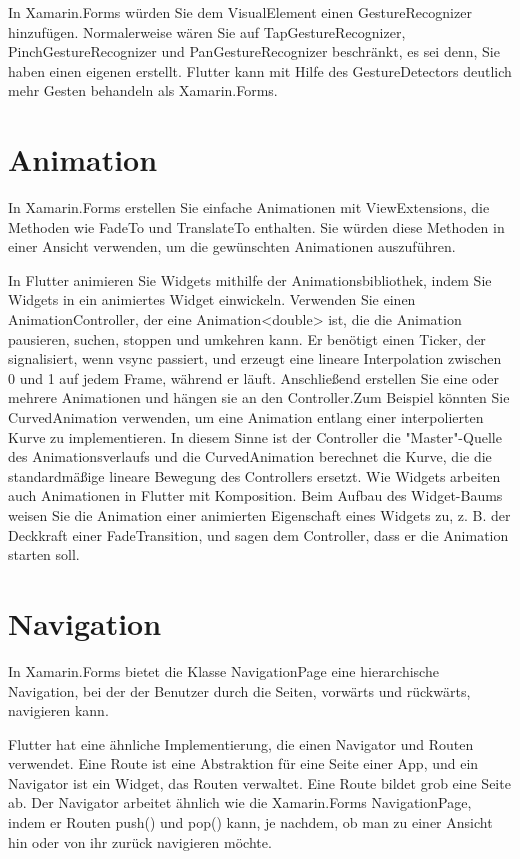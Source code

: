 In Xamarin.Forms würden Sie dem VisualElement einen GestureRecognizer hinzufügen. Normalerweise wären Sie auf TapGestureRecognizer, PinchGestureRecognizer und PanGestureRecognizer beschränkt, es sei denn, Sie haben einen eigenen erstellt. Flutter kann mit Hilfe des GestureDetectors deutlich mehr Gesten behandeln als Xamarin.Forms.

\section{Animation}
In Xamarin.Forms erstellen Sie einfache Animationen mit ViewExtensions, die Methoden wie FadeTo und TranslateTo enthalten. Sie würden diese Methoden in einer Ansicht verwenden, um die gewünschten Animationen auszuführen.

In Flutter animieren Sie Widgets mithilfe der Animationsbibliothek, indem Sie Widgets in ein animiertes Widget einwickeln. Verwenden Sie einen AnimationController, der eine Animation<double> ist, die die Animation pausieren, suchen, stoppen und umkehren kann. Er benötigt einen Ticker, der signalisiert, wenn vsync passiert, und erzeugt eine lineare Interpolation zwischen 0 und 1 auf jedem Frame, während er läuft. Anschließend erstellen Sie eine oder mehrere Animationen und hängen sie an den Controller.Zum Beispiel könnten Sie CurvedAnimation verwenden, um eine Animation entlang einer interpolierten Kurve zu implementieren. In diesem Sinne ist der Controller die "Master"-Quelle des Animationsverlaufs und die CurvedAnimation berechnet die Kurve, die die standardmäßige lineare Bewegung des Controllers ersetzt. Wie Widgets arbeiten auch Animationen in Flutter mit Komposition.
Beim Aufbau des Widget-Baums weisen Sie die Animation einer animierten Eigenschaft eines Widgets zu, z. B. der Deckkraft einer FadeTransition, und sagen dem Controller, dass er die Animation starten soll.

\section{Navigation}
In Xamarin.Forms bietet die Klasse NavigationPage eine hierarchische Navigation, bei der der Benutzer durch die Seiten, vorwärts und rückwärts, navigieren kann.

Flutter hat eine ähnliche Implementierung, die einen Navigator und Routen verwendet. Eine Route ist eine Abstraktion für eine Seite einer App, und ein Navigator ist ein Widget, das Routen verwaltet. Eine Route bildet grob eine Seite ab. Der Navigator arbeitet ähnlich wie die Xamarin.Forms NavigationPage, indem er Routen push() und pop() kann, je nachdem, ob man zu einer Ansicht hin oder von ihr zurück navigieren möchte.

